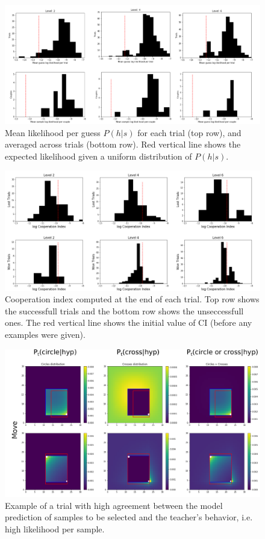 \documentclass[a4paper,10pt]{article}
\begin{document}
\begin{figure}
    \centering
    \includegraphics[width=6.0in]{figures/likelihood_of_guesses.pdf}
    \caption{Mean likelihood per guess $P(h|s)$ for each trial (top row), and averaged across trials (bottom row). Red vertical line shows the expected likelihood given a uniform distribution of $P(h|s)$.}
    \label{dist_2_corners}
\end{figure}


\begin{figure}
    \centering
    \includegraphics[width=6.0in]{figures/Cooperation_Index.pdf}
    \caption{Cooperation index computed at the end of each trial. Top row shows the successfull trials and the bottom row shows the unseccessfull ones. The red vertical line shows the initial value of CI (before any examples were given).}
    \label{dist_2_corners}
\end{figure}



\begin{figure}
    \centering
    \includegraphics[width=6.0in]{figures/high_likelihood_per_sample.pdf}
    \caption{Example of a trial with high agreement between the model prediction of samples to be selected and the teacher's behavior, i.e. high likelihood per sample.}
    \label{}
\end{figure}
\end{document}
